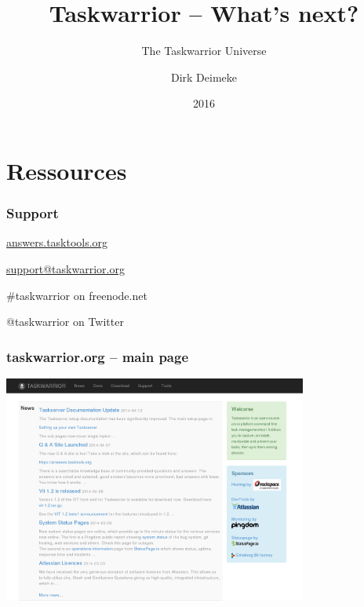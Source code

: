 \documentclass[t,handout]{beamer}
\title{Taskwarrior -- What's next?}
\subtitle{The Taskwarrior Universe}
\author[Deimeke, Dirk]{Dirk Deimeke}
\institute[Taskwarrior Acadamey]{Taskwarrior Acadamy}
\date{2016}
\begin{document}
\begin{frame} %
	\titlepage
\end{frame}



\section{Ressources}

\begin{frame}\frametitle{Support}
\begin{center}
\href{https://answers.tasktools.org/}{answers.tasktools.org}

\href{mailto:support@taskwarrior.org}{support@taskwarrior.org}

\#taskwarrior on freenode.net

@taskwarrior on Twitter
\end{center}
\end{frame}

\begin{frame}\frametitle{taskwarrior.org -- main page}
\begin{center}
\href{http://taskwarrior.org}{\includegraphics[width=10cm,height=7.5cm]{taskwarrior-org.png}}
\end{center}
\end{frame}
\end{document}
